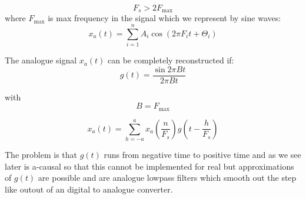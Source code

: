 \documentclass[12pt,a4paper]{article}
\begin{document}
\begin{equation}
F_s > 2 F_{\mbox{max}}
\end{equation}
where $F_{\mbox{max}}$ is max frequency in the signal which we
represent by sine waves:
\begin{equation}
x_{a}(t) = \sum_{i=1}^{n} A_i \cos (2 \pi F_{i}t  + \Theta_{i})
\end{equation}

The analogue signal $x_{a}(t)$ can be completely reconstructed if:
\begin{equation}
g(t) = \frac{\sin 2\pi Bt}{2 \pi Bt}
\end{equation}

with
\begin{equation}
B = F_{\mbox{max}}
\end{equation}

\begin{equation}
x_{a}(t) = \sum_{h= -a}^{a}x_{a}(\frac{n}{F_s})g(t - \frac{h}{F_s})
\end{equation}

The problem is that $g(t)$ runs from negative time to positive time
and as we see later is a-causal so that this cannot be implemented
for real but approximations of $g(t)$ are possible and are analogue
lowpass filters which smooth out the step like outout of an digital
to analogue converter.
\end{document}
